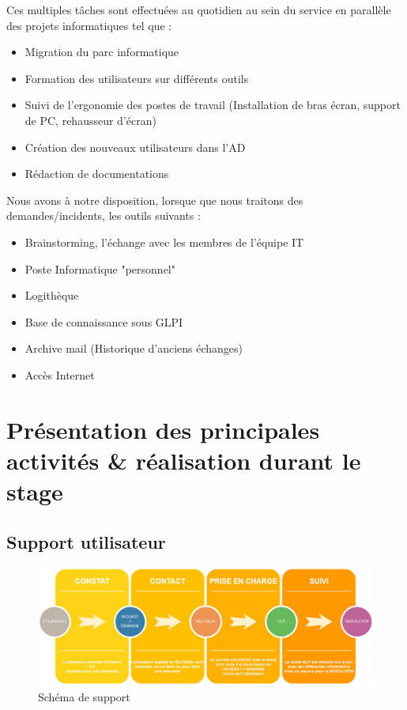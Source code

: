 \documentclass[11pt,a4paper,oneside]{article}
\begin{document}
Ces multiples tâches sont effectuées au quotidien au sein du service en parallèle des projets informatiques tel que :

\begin{itemize}
    \item Migration du parc informatique
    \item Formation des utilisateurs sur différents outils 
    \item Suivi de l'ergonomie des postes de travail (Installation de bras écran, support de PC, rehausseur d'écran) 
    \item Création des nouveaux utilisateurs dans l'AD 
    \item Rédaction de documentations
\end{itemize}

Nous avons à notre disposition, lorsque que nous traitons des demandes/incidents, les outils suivants :

\begin{itemize}
    \item Brainstorming, l'échange avec les membres de l'équipe IT
    \item Poste Informatique "personnel"
    \item Logithèque
    \item Base de connaissance sous GLPI
    \item Archive mail (Historique d'anciens échanges)
    \item Accès Internet 
\end{itemize}

\newpage
\section{Présentation des principales activités \& réalisation durant le stage}
\subsection{Support utilisateur}

\begin{figure}[!h]
\centering
\includegraphics[scale=0.42]{Ressources/GLPI.jpg}
\caption{Schéma de support}
\end{figure}
\end{document}
